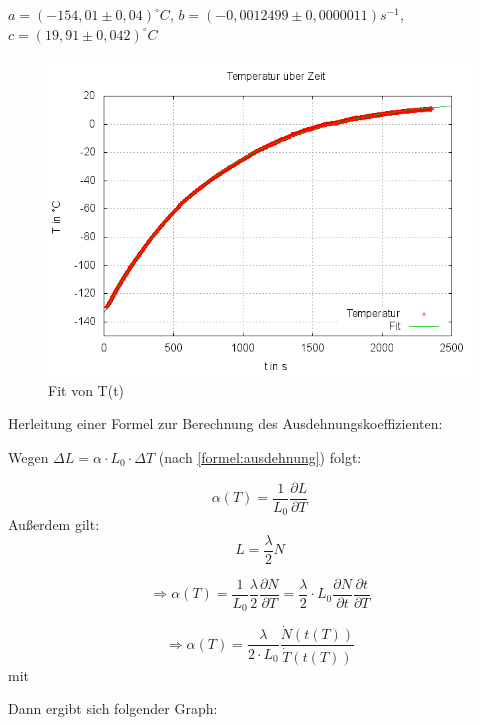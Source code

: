 $a = (-154,01 \pm 0,04)^{\circ}C$,
$b=(-0,0012499 \pm 0,0000011)s^{-1}$,
$c=(19,91 \pm 0,042)^{\circ}C$ \\


\begin{figure}
\centering
        \includegraphics[width=.8\textwidth]{images/Fit_T(t).png}
\caption{Fit von T(t)}
\label{Fit T(t)}
\end{figure}


Herleitung einer Formel zur Berechnung des Ausdehnungskoeffizienten:

Wegen $ \Delta L = \alpha \cdot L_{0} \cdot \Delta T $  (nach \ref{formel:ausdehnung}) folgt: 

\begin{equation}
\alpha (T) = \frac{1}{L_{0}} \frac{\partial L}{\partial T}
\end{equation}
Außerdem gilt: 
\begin{equation}
L = \frac{\lambda}{2} N
\end{equation}

\begin{equation}
\Rightarrow \alpha(T) = \frac{1}{L_{0}} \frac{\lambda}{2} \frac{\partial N}{\partial T} = \frac{\lambda}{2} \cdot L_{0} \frac{\partial N}{\partial t} \frac{\partial t}{\partial T}
\end{equation}

\begin{equation}
\Rightarrow \alpha (T) = \frac{\lambda}{2 \cdot L_{0}} \frac{\dot{N}(t(T))}{\dot{T}(t(T))}
\end{equation} 
mit 

Dann ergibt sich folgender Graph:


